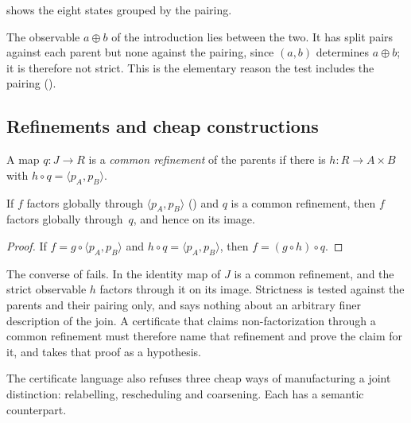  shows the eight states grouped by the pairing.



The observable $a\oplus b$ of the introduction lies between the two. It has split pairs
against each parent but none against the pairing, since $(a,b)$ determines $a\oplus b$;
it is therefore not strict. This is the elementary reason the test includes the pairing
().

\subsection{Refinements and cheap constructions}

\begin{definition}
\label{def:common-refinement}
A map $q:J\to R$ is a \emph{common refinement} of the parents if there is
$h:R\to A\times B$ with $h\circ q=\langle p_A,p_B\rangle$.
\end{definition}

\begin{proposition}
\label{prop:refinement}
If $f$ factors globally through $\langle p_A,p_B\rangle$ () and $q$
is a common refinement, then $f$ factors globally through~$q$, and hence on its image.
\end{proposition}

\begin{proof}
If $f=g\circ\langle p_A,p_B\rangle$ and $h\circ q=\langle p_A,p_B\rangle$, then
$f=(g\circ h)\circ q$.
\end{proof}

\begin{remark}
\label{rem:refinement-limit}
The converse of  fails. In  the identity map of $J$ is
a common refinement, and the strict observable $h$ factors through it on its image.
Strictness is tested against the parents and their pairing only, and says nothing about
an arbitrary finer description of the join. A certificate that claims non-factorization
through a common refinement must therefore name that refinement and prove the claim for
it, and  takes that proof as a hypothesis.
\end{remark}

The certificate language also refuses three cheap ways of manufacturing a joint
distinction: relabelling, rescheduling and coarsening. Each has a semantic counterpart.

